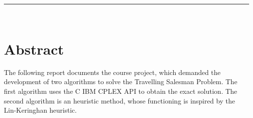 \documentclass[a4paper,12pt]{article}
\makeatletter
\def\cleardoublepage{\clearpage\if@twoside \ifodd\c@page\else%
  \hbox{}%
  \thispagestyle{empty}%
  \newpage%
  \if@twocolumn\hbox{}\newpage\fi\fi\fi}
\theoremstyle{break}
\makeatother
\begin{document}



\begingroup
\hypersetup{colorlinks=false, linkcolor=black}
\thispagestyle{empty}
\tableofcontents
\thispagestyle{empty}
\listoffigures
\thispagestyle{empty}
\listoftables
\endgroup


\thispagestyle{empty}
\clearpage
\noindent\rule[2pt]{\textwidth}{0.5pt}\\
\thispagestyle{empty}
\section*{Abstract}
The following report documents the course project, which demanded the development of two algorithms to solve the Travelling Salesman Problem. The first algorithm uses the C IBM CPLEX API to obtain the exact solution. The second algorithm is an heuristic method, whose functioning is inspired by the Lin-Keringhan heuristic.


\pagestyle{fancy}

\cleardoublepage






\appendix




\clearpage
\end{document}

